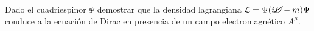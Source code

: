Dado el cuadriespinor $\Psi$ demostrar que la densidad lagrangiana $\mathcal{L} = \bar{\Psi}(i \cancel{D} -m)\Psi$ conduce a la ecuación de Dirac en presencia de un campo electromagnético $A^\mu$.

\begin{solution}\ \\

\end{solution}